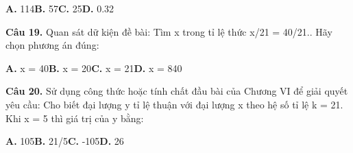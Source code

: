 \documentclass[11pt,a4paper]{article}
\begin{document}
\hspace*{1.5em}\textbf{A.} 114\quad\quad \textbf{B.} 57\quad\quad \textbf{C.} 25\quad\quad \textbf{D.} 0.32\par\vspace{2pt}
\textbf{\color{primary} Câu 19.} Quan sát dữ kiện đề bài: Tìm x trong tỉ lệ thức x/21 = 40/21.. Hãy chọn phương án đúng:\par
\hspace*{1.5em}\textbf{A.} x = 40\quad\quad \textbf{B.} x = 20\quad\quad \textbf{C.} x = 21\quad\quad \textbf{D.} x = 840\par\vspace{2pt}
\textbf{\color{primary} Câu 20.} Sử dụng công thức hoặc tính chất đầu bài của Chương VI để giải quyết yêu cầu: Cho biết đại lượng y tỉ lệ thuận với đại lượng x theo hệ số tỉ lệ k = 21. Khi x = 5 thì giá trị của y bằng:\par
\hspace*{1.5em}\textbf{A.} 105\quad\quad \textbf{B.} 21/5\quad\quad \textbf{C.} -105\quad\quad \textbf{D.} 26\par\vspace{2pt}
\end{document}
